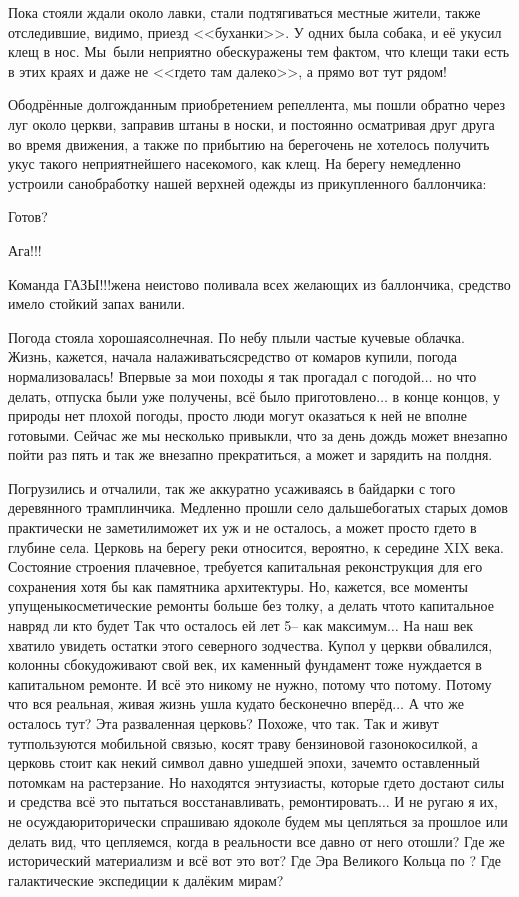 Пока стояли ждали около лавки, стали подтягиваться местные жители, также отследившие, видимо, приезд <<буханки>>. У одних была собака, и её укусил клещ в нос. Мы~были неприятно обескуражены тем фактом, что клещи таки есть в этих краях и даже не <<где\sdash то там далеко>>, а прямо вот тут рядом!

Ободрённые долгожданным приобретением репеллента, мы пошли обратно через луг около церкви, заправив штаны в носки, и постоянно осматривая друг друга во время движения, а также по прибытию на берег\mdash очень не хотелось получить укус такого неприятнейшего насекомого, как клещ. На берегу немедленно устроили санобработку нашей верхней одежды из прикупленного баллончика:

\diagdash Готов?

\diagdash Ага!!!

\diagdash Команда ГАЗЫ!!!\mdash жена неистово поливала всех желающих из баллончика, средство имело стойкий запах ванили.

Погода стояла хорошая\mdash солнечная. По небу плыли частые кучевые облачка. Жизнь, кажется, начала налаживаться\mdash средство от комаров купили, погода нормализовалась! Впервые за мои походы я так прогадал с погодой$\ldots$ но что делать, отпуска были уже получены, всё было приготовлено$\ldots$ в конце концов, у природы нет плохой погоды, просто люди могут оказаться к ней не вполне готовыми. Сейчас же мы несколько привыкли, что за день дождь может внезапно пойти раз пять и так же внезапно прекратиться, а может и зарядить на полдня. 

Погрузились и отчалили, так же аккуратно усаживаясь в байдарки с того деревянного трамплинчика. Медленно прошли село дальше\mdash богатых старых домов практически не заметили\mdash может их уж и не осталось, а может просто где\sdash то в глубине села. Церковь на берегу реки относится, вероятно, к середине XIX века. Состояние строения плачевное, требуется капитальная реконструкция для его сохранения хотя бы как памятника архитектуры. Но, кажется, все моменты упущены\mdash косметические ремонты больше без толку, а делать что\sdash то капитальное навряд ли кто будет Так что осталось ей лет 5\thinspace\nobreakdash-- как максимум$\ldots$ На наш век хватило увидеть остатки этого северного зодчества. Купол у церкви обвалился, колонны сбоку\mdash доживают свой век, их каменный фундамент тоже нуждается в капитальном ремонте. И всё это никому не нужно, потому что потому. Потому что вся реальная, живая жизнь ушла куда\sdash то бесконечно вперёд$\ldots$ А что же осталось тут? Эта разваленная церковь? Похоже, что так. Так и живут тут\mdash пользуются мобильной связью, косят траву бензиновой газонокосилкой, а церковь стоит как некий символ давно ушедшей эпохи, зачем\sdash то оставленный потомкам на растерзание. Но находятся энтузиасты, которые где\sdash то достают силы и средства всё это пытаться восстанавливать, ремонтировать$\ldots$ И не ругаю я их, не осуждаю\mdash риторически спрашиваю я\mdash доколе будем мы цепляться за прошлое или делать вид, что цепляемся, когда в реальности все давно от него отошли? Где же исторический материализм и всё вот это вот? Где Эра Великого Кольца по \cite{ТуманностьАндромеды}? Где галактические экспедиции к далёким мирам?

